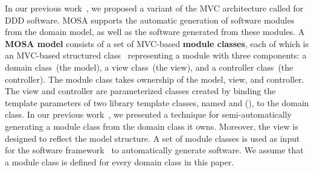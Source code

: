 In our previous work~\cite{le_tree-based_2015, le_generative_2018}, we proposed a variant of the MVC architecture called  for DDD software. MOSA supports the automatic generation of software modules from the domain model, as well as the software generated from these modules. %
%
A \textbf{MOSA model} consists of a set of MVC-based \textbf{module classes}, each of which is an MVC-based structured class~\cite{omg_unified_2017} representing a module with three components: a domain class~(the model), a view class~(the view), and a controller class~(the controller). The module class takes ownership of the model, view, and controller. The view and controller are parameterized classes created by binding the template parameters of two library template classes, named  and  (\resp), to the domain class. %
%
In our previous work~\cite{le_generative_2018}, we presented a technique for semi-automatically generating a module class from the domain class it owns. Moreover, the view is designed to reflect the model structure. A set of module classes is used as input for the \jdomainapp software framework~\cite{le_jdomainapp_2017} to automatically generate software. We assume that a module class is defined for every domain class in this paper.

